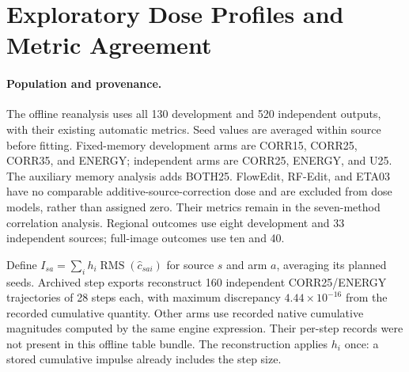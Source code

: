 \section{Exploratory Dose Profiles and Metric Agreement}
\label{sec:doseprofiles}
\paragraph{Population and provenance.}
The offline reanalysis uses all 130 development and 520 independent outputs, with their existing automatic metrics. Seed values are averaged within source before fitting. Fixed-memory development arms are CORR15, CORR25, CORR35, and ENERGY; independent arms are CORR25, ENERGY, and U25. The auxiliary memory analysis adds BOTH25. FlowEdit, RF-Edit, and ETA03 have no comparable additive-source-correction dose and are excluded from dose models, rather than assigned zero. Their metrics remain in the seven-method correlation analysis. Regional outcomes use eight development and 33 independent sources; full-image outcomes use ten and 40.

Define $I_{sa}=\sum_i h_i\operatorname{RMS}(\widehat c_{sai})$ for source $s$ and arm $a$, averaging its planned seeds. Archived step exports reconstruct 160 independent CORR25/ENERGY trajectories of 28 steps each, with maximum discrepancy $4.44\times10^{-16}$ from the recorded cumulative quantity. Other arms use recorded native cumulative magnitudes computed by the same engine expression. Their per-step records were not present in this offline table bundle. The reconstruction applies $h_i$ once: a stored cumulative impulse already includes the step size.



